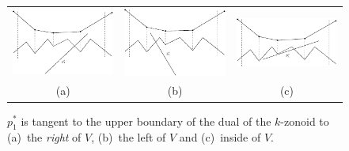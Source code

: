 \documentclass[charterfonts,lotsofwhite]{patmorin}
\begin{document}
\begin{figure}[h!]
 \begin{center}
   \begin{center}\begin{tabular}{ccc} 
   \includegraphics[width=1.8in]{figs/fig5a} &
   \includegraphics[width=1.8in]{figs/fig5b} &
   \includegraphics[width=1.8in]{figs/fig5c} \\
   (a) & (b) & (c)
   \end{tabular}\end{center}
   \caption{\label{fig_vertical_strip_abc}$p_1^*$ is tangent to the
upper boundary of the dual of the $k$-zonoid to (a)~the \emph{right}
of $V$, (b)~the left of $V$ and (c)~inside of $V$.}
 \end{center}
\end{figure}
\end{document}

